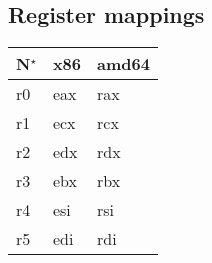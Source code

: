 \subsection{Register mappings}\label{subsec:nstar-specific-x86amd64-registers}

\begin{tabularx}{\textwidth}{Y Y Y}
  \toprule
  N$^\star$ & x86 & amd64 \\
  \midrule
  r0 & eax & rax \\
  r1 & ecx & rcx \\
  r2 & edx & rdx \\
  r3 & ebx & rbx \\
  r4 & esi & rsi \\
  r5 & edi & rdi \\
  \bottomrule
\end{tabularx}
